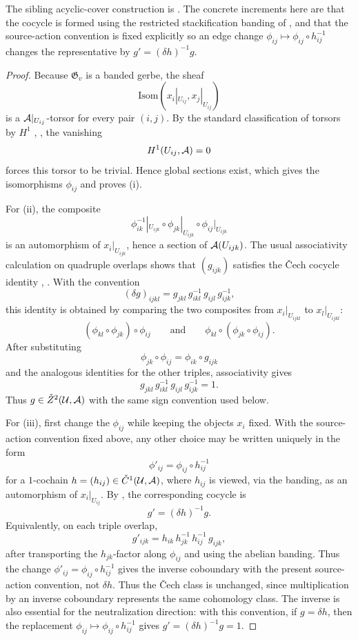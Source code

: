 \begin{remark}
The sibling acyclic-cover construction is
\cite[Proposition~4.50]{HomologicalVisibilityGluingObstructions2026}. The
concrete increments here are that the cocycle is formed using the restricted
stackification banding of , and that
the source-action convention is fixed explicitly so an edge change
$\phi_{ij}\mapsto\phi_{ij}\circ h_{ij}^{-1}$ changes the representative by
$g'=(\delta h)^{-1}g$.
\end{remark}

\begin{proof}
Because $\mathfrak G_v$ is a banded gerbe, the sheaf
\[
\mathrm{Isom}(x_i|_{U_{ij}},x_j|_{U_{ij}})
\]
is a $\mathcal{A}|_{U_{ij}}$-torsor for every pair $(i,j)$. By the standard classification of torsors by $H^1$ \cite[Chap.~III]{MacLaneMoerdijk1994}, \cite[Sec.~11]{StacksProject}, the vanishing
\[
H^1(U_{ij},\mathcal{A})=0
\]
forces this torsor to be trivial. Hence global sections exist, which gives the isomorphisms $\phi_{ij}$ and proves \textup{(i)}.

For \textup{(ii)}, the composite
\[
\phi_{ik}^{-1}|_{U_{ijk}}\circ \phi_{jk}|_{U_{ijk}}\circ \phi_{ij}|_{U_{ijk}}
\]
is an automorphism of $x_i|_{U_{ijk}}$, hence a section of $\mathcal{A}(U_{ijk})$. The usual associativity calculation on quadruple overlaps shows that $(g_{ijk})$ satisfies the \v{C}ech cocycle identity \cite[Chap.~IV]{Giraud1971}, \cite[Sec.~11]{StacksProject}.
With the convention
\[
(\delta g)_{ijkl}=g_{jkl}\,g_{ikl}^{-1}\,g_{ijl}\,g_{ijk}^{-1},
\]
this identity is obtained by comparing the two composites from
$x_i|_{U_{ijkl}}$ to $x_l|_{U_{ijkl}}$:
\[
(\phi_{kl}\circ\phi_{jk})\circ\phi_{ij}
\qquad\text{and}\qquad
\phi_{kl}\circ(\phi_{jk}\circ\phi_{ij}).
\]
After substituting
\[
\phi_{jk}\circ\phi_{ij}=\phi_{ik}\circ g_{ijk}
\]
and the analogous identities for the other triples, associativity gives
\[
g_{jkl}\,g_{ikl}^{-1}\,g_{ijl}\,g_{ijk}^{-1}=1.
\]
Thus $g\in\check Z^2(\mathcal U,\mathcal{A})$ with the same sign convention used below.

For \textup{(iii)}, first change the $\phi_{ij}$ while keeping the objects $x_i$ fixed. With the source-action convention fixed above, any other choice may be written uniquely in the form
\[
\phi'_{ij}=\phi_{ij}\circ h_{ij}^{-1}
\]
for a $1$-cochain $h=(h_{ij})\in \check C^1(\mathcal U,\mathcal{A})$, where $h_{ij}$ is viewed, via the banding, as an automorphism of $x_i|_{U_{ij}}$. By , the corresponding cocycle is
\[
g'=(\delta h)^{-1}g.
\]
Equivalently, on each triple overlap,
\[
g'_{ijk}
=h_{ik}\,h_{jk}^{-1}\,h_{ij}^{-1}\,g_{ijk},
\]
after transporting the $h_{jk}$-factor along $\phi_{ij}$ and using the abelian
banding. Thus the change $\phi'_{ij}=\phi_{ij}\circ h_{ij}^{-1}$ gives the
inverse coboundary with the present source-action convention, not $\delta h$.
Thus the \v{C}ech class is unchanged, since multiplication by an inverse coboundary represents the same cohomology class. The inverse is also essential for the neutralization direction: with this convention, if $g=\delta h$, then the replacement $\phi_{ij}\mapsto \phi_{ij}\circ h_{ij}^{-1}$ gives $g'=(\delta h)^{-1}g=1$.


\end{proof}
